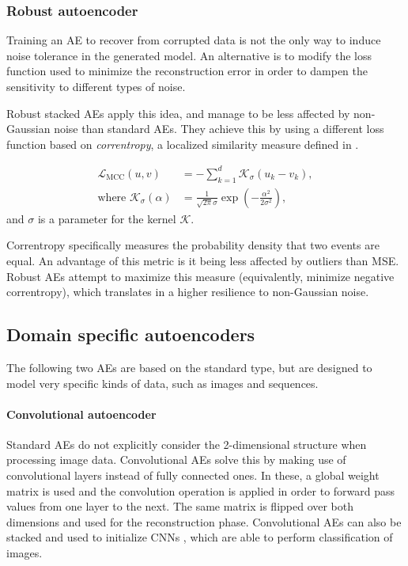 \documentclass[preprint,5p,compress]{elsarticle}
\begin{document}
\subsubsection{Robust autoencoder}

Training an AE to recover from corrupted data is not the only way to induce noise tolerance in the generated model. An alternative is to modify the loss function used to minimize the reconstruction error in order to dampen the sensitivity to different types of noise.

Robust stacked AEs \cite{qi_robust_2014} apply this idea, and manage to be less affected by non-Gaussian noise than standard AEs. They achieve this by using a different loss function based on \textit{correntropy}, a localized similarity measure defined in \cite{liu_correntropy_2006}. 

\begin{align}
  \mathcal L_{\mathrm{MCC}}(u, v)&=-\sum_{k=1}^d\mathcal K_{\sigma}(u_k-v_k),\\\text{where }
  \mathcal K_{\sigma}(\alpha)&=\frac{1}{\sqrt{2\pi}\sigma}\exp\left(-\frac{\alpha^2}{2\sigma^2}\right),
\end{align}
and $\sigma$ is a parameter for the kernel $\mathcal K$.

Correntropy specifically measures the probability density that two events are equal. An advantage of this metric is it being less affected by outliers than MSE. Robust AEs attempt to maximize this measure (equivalently, minimize negative correntropy), which translates in a higher resilience to non-Gaussian noise.

\subsection{Domain specific autoencoders}\label{Sec.DomainSpecific}

The following two AEs are based on the standard type, but are designed to model very specific kinds of data, such as images and sequences.

\paragraph{Convolutional autoencoder \cite{ConvolutionalAE}} Standard AEs do not explicitly consider the 2-dimensional structure when processing image data. Convolutional AEs solve this by making use of convolutional layers instead of fully connected ones. In these, a global weight matrix is used and the convolution operation is applied in order to forward pass values from one layer to the next. The same matrix is flipped over both dimensions and used for the reconstruction phase. Convolutional AEs can also be stacked and used to initialize CNNs \cite{CNNsLeCun}, which are able to perform classification of images.
\end{document}
